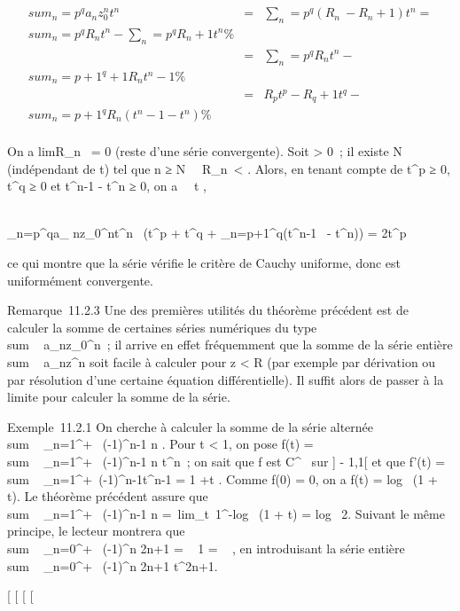 \documentclass[]{article}
\begin{document}
\begin{align*} \\sum
_n=p^qa_ nz_0^nt^n&
=& \sum _n=p^q(R_ n~ -
R_n+1)t^n = \\sum
_n=p^qR_ nt^n
-\sum _n=p^qR_
n+1t^n\%& \\ & =&
\sum _n=p^qR_
nt^n -\\sum
_n=p+1^q+1R_ nt^n-1 \%&
\\ & =& R_pt^p -
R_ q+1t^q -\\sum
_n=p+1^qR_ n(t^n-1 - t^n)
\%& \\ \end{align*}

On a limR_n~ = 0 (reste d'une série
convergente). Soit \epsilon > 0~; il existe N \in {}~ (indépendant de
t) tel que n ≥ N \rigtharrow~\
R_n\ < \epsilon
{} . Alors, en tenant compte de t^p ≥
0, t^q ≥ 0 et t^n-1 - t^n ≥ 0, on a
\forall~~t \in [0,1],

\\\sum
_n=p^qa_
nz_0^nt^n\ \leq \epsilon
{} (t^p + t^q +
\sum _n=p+1^q(t^n-1~ -
t^n)) = 2t^p \epsilon {} \leq \epsilon

ce qui montre que la série vérifie le critère de Cauchy uniforme, donc
est uniformément convergente.

Remarque~11.2.3 Une des premières utilités du théorème précédent est de
calculer la somme de certaines séries numériques du type
\\sum ~
a_nz_0^n~; il arrive en effet fréquemment que
la somme de la série entière
\\sum ~
a_nz^n soit facile à calculer pour
z < R (par exemple par dérivation ou par
résolution d'une certaine équation différentielle). Il suffit alors de
passer à la limite pour calculer la somme de la série.

Exemple~11.2.1 On cherche à calculer la somme de la série alternée
\\sum ~
_n=1^+\infty~ (-1)^n-1 \over n .
Pour t < 1, on pose f(t)
= \\sum ~
_n=1^+\infty~ (-1)^n-1 \over n
t^n~; on sait que f est C^\infty~ sur ] - 1,1[ et
que f'(t) = \\sum ~
_n=1^+\infty~(-1)^n-1t^n-1 = 1
+t . Comme f(0) = 0, on a f(t)
= log~ (1 + t). Le théorème précédent assure
que \\sum ~
_n=1^+\infty~ (-1)^n-1 \over n
=\
lim_t\rightarrow~1^-log~ (1 + t)
= log~ 2. Suivant le même principe, le lecteur
montrera que \\sum ~
_n=0^+\infty~ (-1)^n \over 2n+1
= \mathrmarctg~ 1 = \pi~
 , en introduisant la série entière
\\sum ~
_n=0^+\infty~ (-1)^n \over 2n+1
t^2n+1.

[
[
[
[
\end{document}
